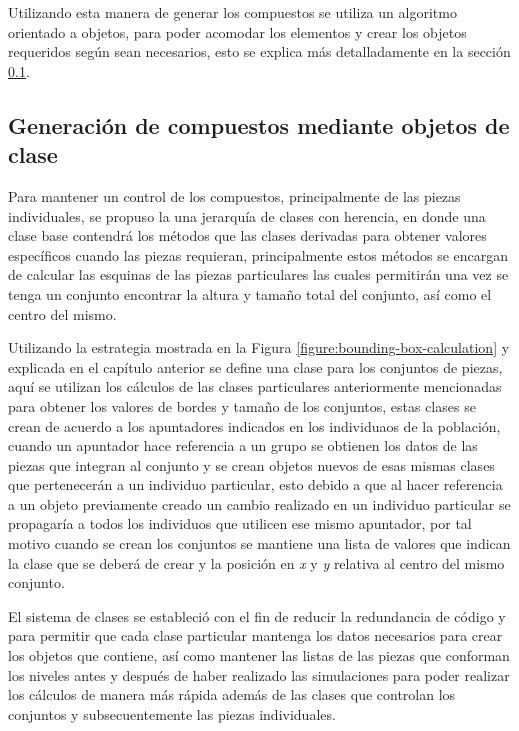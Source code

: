 Utilizando esta manera de generar los compuestos se utiliza un
algoritmo orientado a objetos, para poder acomodar los elementos y crear los objetos
requeridos según sean necesarios, esto se explica más detalladamente en la
sección \ref{subsection:classorientedidea}.

\subsection{Generación de compuestos mediante objetos de clase}
\label{subsection:classorientedidea}

Para mantener un control de los compuestos, principalmente de las piezas
individuales, se propuso la una jerarquía de clases con
herencia, en donde una clase base contendrá los métodos que las clases derivadas
para obtener valores específicos cuando las piezas requieran,
principalmente estos métodos se encargan de calcular las esquinas de las piezas
particulares las cuales permitirán una vez se tenga un conjunto encontrar la
altura y tamaño total del conjunto, así como el centro del mismo.

Utilizando la estrategia mostrada en la Figura
\ref{figure:bounding-box-calculation} y explicada en el capítulo anterior se
define una clase para los conjuntos de piezas, aquí se utilizan los cálculos de
las clases particulares anteriormente mencionadas para obtener los valores de
bordes y tamaño de los conjuntos, estas clases se crean de acuerdo a los
apuntadores indicados en los individuaos de la población, cuando un apuntador
hace referencia a un grupo se obtienen los datos de las piezas que integran al
conjunto y se crean objetos nuevos de esas mismas clases que pertenecerán a un
individuo particular, esto debido a que al hacer referencia a un objeto
previamente creado un cambio realizado en un individuo particular se propagaría
a todos los individuos que utilicen ese mismo apuntador, por tal motivo cuando
se crean los conjuntos se mantiene una lista de valores que indican la clase que
se deberá de crear y la posición en \textit{x} y \textit{y} relativa al centro
del mismo conjunto.

El sistema de clases se estableció con el fin de reducir la redundancia de
código y para permitir que cada clase particular mantenga los datos necesarios
para crear los objetos que contiene, así como mantener las listas de las piezas
que conforman los niveles antes y después de haber realizado las simulaciones
para poder realizar los cálculos de manera más rápida además de las clases que
controlan los conjuntos y subsecuentemente las piezas individuales. 

